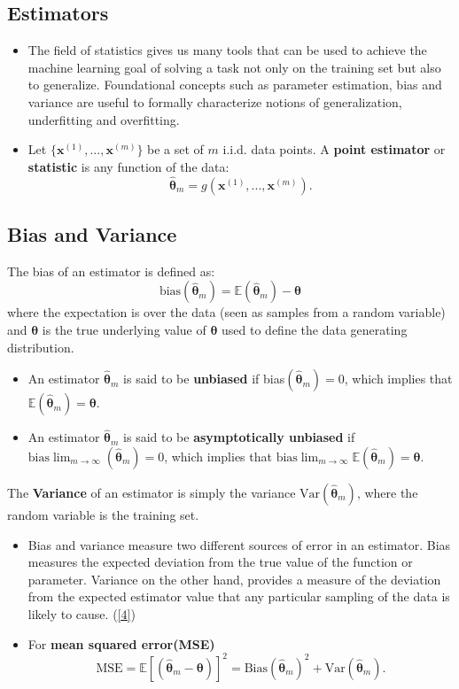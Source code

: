 \subsection{Estimators}
    \begin{itemize}
        \item The field of statistics gives us many tools that can be used to achieve the machine	learning goal of solving a task not only on the training set but also to generalize.	Foundational concepts such as parameter estimation, bias and variance are useful	to formally characterize notions of generalization, underfitting and overfitting.
        \item Let $\{\mathbf{x}^{(1)},...,\mathbf{x}^{(m)}\}$ be a set of $m$ i.i.d. data points. A \textbf{point estimator} or \textbf{statistic} is any function of the data:
        $$
        \hat{\bm \theta}_m=g(\mathbf{x}^{(1)},...,\mathbf{x}^{(m)}).
        $$
    \end{itemize}


\subsection{Bias and Variance}
    The bias of an estimator is defined as:
    $$
    \text{bias}(\hat{\bm \theta}_m)=\mathbb{E}(\hat{\bm \theta}_m)-\bm \theta
    $$
    where the expectation is over the data (seen as samples from a random variable) and $\bm\theta$ is the true underlying value of $\bm\theta$	used to define the data generating distribution.
    \begin{itemize}
        \item An estimator $\hat{\bm \theta}_m$ is said to be \textbf{unbiased} if bias$(\hat{\bm \theta}_m)=0$,
        which implies that $\mathbb{E}(\hat{\bm \theta}_m)=\bm\theta$.
        \item An estimator $\hat{\bm \theta}_m$ is said to be \textbf{asymptotically unbiased} if $\text{bias}\lim_{m\rightarrow\infty}(\hat{\bm \theta}_m)=0$,
        which implies that $\text{bias}\lim_{m\rightarrow\infty}\mathbb{E}(\hat{\bm \theta}_m)=\bm\theta$.
    \end{itemize}
    The \textbf{Variance} of an estimator is simply the variance $\text{Var} (\hat{\bm \theta}_m)$, where the random variable is the training set.
    

    \begin{itemize}
        \item Bias and variance measure two different sources of error in an estimator. Bias measures the expected deviation from the true value of the function or parameter. Variance on the other hand, provides a measure of the deviation from the expected estimator value that any particular sampling of the data is likely to cause. (\eqref{4})
        \item For \textbf{mean squared error(MSE)}
        $$
        \text{MSE}=\mathbb E[(\hat{\bm \theta}_m-\bm{\theta})]^2=\text{Bias}(\hat{\bm \theta}_m)^2+\text{Var}(\hat{\bm \theta}_m).
        $$
    \end{itemize}


